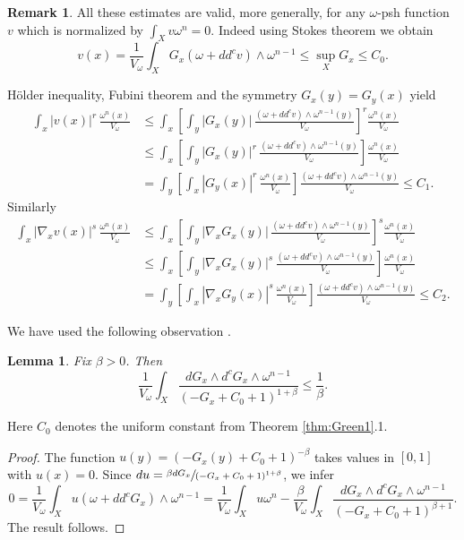 \documentclass[11pt]{article}
\numberwithin{equation}{section}
\newtheorem{lem}[theorem]{Lemma}
\theoremstyle{definition}
\newtheorem{rem}[theorem]{Remark}
\begin{document}
\begin{rem}
All these estimates are valid, more generally, for any $\omega$-psh function~$v$ which is
normalized by $\int_X v \omega^n=0$. Indeed using Stokes theorem we obtain
\[
v(x) =\frac{1}{V_{\omega}} \int_X G_x (\omega+dd^c v) \wedge \omega^{n-1} \leq \sup_X G_x \leq C_0.
\]

Hölder inequality, Fubini theorem and the symmetry $G_x(y)=G_y(x)$ yield
\begin{align*}
\int_x |v(x)|^r \,\frac{\omega^n(x)}{V_{\omega}}
&\leq  \int_x \left[ \int_y |G_x(y)|\, \frac{(\omega+dd^c v) \wedge \omega^{n-1}(y)}{V_{\omega}} \right]^r \frac{\omega^n(x)}{V_{\omega}} \\
&\leq  \int_x \left[ \int_y |G_x(y)|^r\, \frac{(\omega+dd^c v) \wedge \omega^{n-1}(y)}{V_{\omega}} \right] \frac{\omega^n(x)}{V_{\omega}} \\
&= \int_y \left[ \int_x |G_y(x)|^r\, \frac{\omega^n(x)}{V_{\omega}} \right] \frac{(\omega+dd^c v) \wedge \omega^{n-1}(y)}{V_{\omega}} \leq C_1.
\end{align*}
Similarly
\begin{align*}
\int_x |\nabla_x v(x)|^s \,\frac{\omega^n(x)}{V_{\omega}}
&\leq  \int_x \left[ \int_y | \nabla_x G_x(y)|\, \frac{(\omega+dd^c v) \wedge \omega^{n-1}(y)}{V_{\omega}} \right]^s \frac{\omega^n(x)}{V_{\omega}} \\
&\leq  \int_x \left[ \int_y |\nabla_x G_x(y)|^s\, \frac{(\omega+dd^c v) \wedge \omega^{n-1}(y)}{V_{\omega}} \right] \frac{\omega^n(x)}{V_{\omega}} \\
&= \int_y \left[ \int_x |\nabla_x G_y(x)|^s\, \frac{\omega^n(x)}{V_{\omega}} \right] \frac{(\omega+dd^c v) \wedge \omega^{n-1}(y)}{V_{\omega}} \leq C_2.
\end{align*}
\end{rem}

We have used the following observation \cite[Lem.\,5.6]{GPSS22}.

\begin{lem} \label{lem:weightedgradient}
Fix $\beta>0$. Then
\[
\frac{1}{V_{\omega}} \int_X \frac{d G_x \wedge d^c G_x \wedge \omega^{n-1}}{(-G_x+C_0+1)^{1+\beta}} \leq \frac{1}{\beta}.
\]
\end{lem}

Here $C_0$ denotes the uniform constant from Theorem \ref{thm:Green1}.1.

\begin{proof}
The function $u(y)=(-G_x(y)+C_0+1)^{-\beta}$ takes values in $[0,1]$ with $u(x)=0$.
Since $du=\sfrac{\beta dG_x}{(-G_x+C_0+1)^{1+\beta}}$, we infer
\[
0=\frac{1}{V_{\omega}} \int_X u (\omega+dd^c G_x) \wedge \omega^{n-1}
=\frac{1}{V_{\omega}} \int_X u \omega^{n}
- \frac{\beta}{V_{\omega}} \int_X \frac{d G_x \wedge d^c G_x \wedge \omega^{n-1}}{(-G_x+C_0+1)^{\beta+1}}.
\]
The result follows.
\end{proof}
\end{document}
